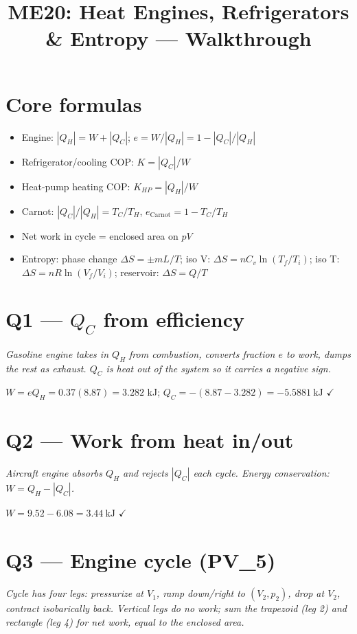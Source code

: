 \documentclass[11pt]{article}
\title{ME20: Heat Engines, Refrigerators \& Entropy --- Walkthrough}
\author{}\date{}
\newcommand{\checkmk}{\ensuremath{\checkmark}}
\begin{document}
\maketitle

\section*{Core formulas}
\begin{itemize}[leftmargin=*]
\item Engine: $|Q_H| = W + |Q_C|$; $e = W/|Q_H| = 1 - |Q_C|/|Q_H|$
\item Refrigerator/cooling COP: $K = |Q_C|/W$
\item Heat-pump heating COP: $K_{HP} = |Q_H|/W$
\item Carnot: $|Q_C|/|Q_H| = T_C/T_H$, $e_{\text{Carnot}} = 1 - T_C/T_H$
\item Net work in cycle = enclosed area on $pV$
\item Entropy: phase change $\Delta S = \pm mL/T$; iso V: $\Delta S = nC_v\ln(T_f/T_i)$; iso T: $\Delta S = nR\ln(V_f/V_i)$; reservoir: $\Delta S = Q/T$
\end{itemize}

\section*{Q1 --- $Q_C$ from efficiency}
\emph{Gasoline engine takes in $Q_H$ from combustion, converts fraction $e$ to work, dumps the rest as exhaust. $Q_C$ is heat \emph{out of} the system so it carries a negative sign.}

$W = e Q_H = 0.37(8.87) = 3.282$ kJ; $Q_C = -(8.87 - 3.282) = \boxed{-5.5881\ \text{kJ}}$ \checkmk

\section*{Q2 --- Work from heat in/out}
\emph{Aircraft engine absorbs $Q_H$ and rejects $|Q_C|$ each cycle. Energy conservation: $W = Q_H - |Q_C|$.}

$W = 9.52 - 6.08 = \boxed{3.44\ \text{kJ}}$ \checkmk

\section*{Q3 --- Engine cycle (PV\_5)}
\emph{Cycle has four legs: pressurize at $V_1$, ramp down/right to $(V_2,p_2)$, drop at $V_2$, contract isobarically back. Vertical legs do no work; sum the trapezoid (leg 2) and rectangle (leg 4) for net work, equal to the enclosed area.}
\end{document}
